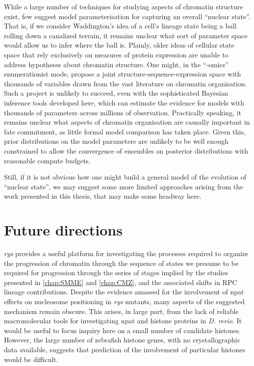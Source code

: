 While a large number of techniques for studying aspects of chromatin structure exist, few suggest model parameterisation for capturing an overall ``nuclear state''. That is, if we consider Waddington's idea of a cell's lineage state being a ball rolling down a canalized terrain, it remains unclear what sort of parameter space would allow us to infer where the ball is. Plainly, older ideas of cellular state space that rely exclusively on measures of protein expression are unable to address hypotheses about chromatin structure. One might, in the ``-omics'' enumerationist mode, propose a joint structure-sequence-expression space with thousands of variables drawn from the vast literature on chromatin organisation. Such a project is unlikely to succeed, even with the sophisticated Bayesian inference tools developed here, which can estimate the evidence for models with thousands of parameters across millions of observation. Practically speaking, it remains unclear what aspects of chromatin organisation are causally important in fate commitment, as little formal model comparison has taken place. Given this, prior distributions on the model parameters are unlikely to be well enough constrained to allow the convergence of ensembles on posterior distributions with reasonable compute budgets.

Still, if it is not obvious how one might build a general model of the evolution of ``nuclear state'', we may suggest some more limited approaches arising from the work presented in this thesis, that may make some headway here.

\section{Future directions}
\textit{rys} provides a useful platform for investigating the processes required to organize the progression of chromatin through the sequence of states we presume to be required for progression through the series of stages implied by the studies presented in \autoref{chap:SMME} and \autoref{chap:CMZ}, and the associated shifts in RPC lineage contributions. Despite the evidence amassed for the involvement of npat effects on nucleosome positioning in \textit{rys} mutants, many aspects of the suggested mechanism remain obscure. This arises, in large part, from the lack of reliable macromolecular tools for investigating npat and histone proteins in \textit{D. rerio}. It would be useful to focus inquiry here on a small number of candidate histones. However, the large number of zebrafish histone genes, with no crystallographic data available, suggests that prediction of the involvement of particular histones would be difficult.

